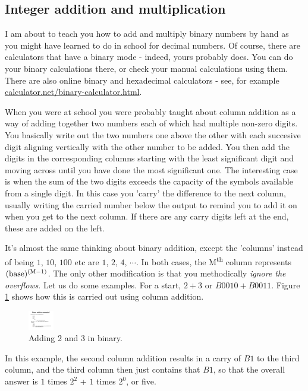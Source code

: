 \documentclass[../physical_computing.tex]{subfiles}
\begin{document}
\subsection{Integer addition and multiplication}
\label{sec:addmultiply}

I am about to teach you how to add and multiply binary numbers by hand as you might have learned to do in school for decimal numbers. Of course, there are calculators that have a binary mode - indeed, yours probably does. You can do your binary calculations there, or check your manual calculations using them. There are also online binary and hexadecimal calculators - see, for example \url{calculator.net/binary-calculator.html}.

When you were at school you were probably taught about column addition as a way of adding together two numbers each of which had multiple non-zero digits. You basically write out the two numbers one above the other with each succesive digit aligning vertically with the other number to be added. You then add the digits in the corresponding columns starting with the least significant digit and moving across until you have done the most significant one. The interesting case is when the sum of the two digits exceeds the capacity of the symbols available from a single digit. In this case you 'carry' the difference to the next column, usually writing the carried number below the output to remind you to add it on when you get to the next column. If there are any carry digits left at the end, these are added on the left. 

It's almost the same thinking about binary addition, except the 'columns' instead of being $1$, $10$, $100$ etc are $1$, $2$, $4$, $\cdots$. In both cases, the M\textsuperscript{th} column represents $\rm (base)^{(M-1)}$. The only other modification is that you methodically {\it ignore the overflows}. Let us do some examples. For a start, $2+3$ or $B0010+B0011$. Figure \ref{fig:addition_example_1} shows how this is carried out using column addition.
\begin{figure}[h!]
    \centering
    \includegraphics[width=0.1\textwidth]{figures/addition_example_1.pdf}
    \caption{Adding 2 and 3 in binary.}
    \label{fig:addition_example_1}
\end{figure}
In this example, the second column addition results in a carry of $B1$ to the third column, and the third column then just contains that $B1$, so that the overall answer is $1$ times $2^2$ + $1$ times $2^0$, or five.
\end{document}
